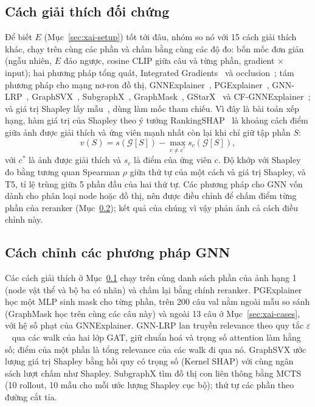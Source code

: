 \subsection{Cách giải thích đối chứng}\label{sec:xai-baselines}
Để biết $E$ (Mục~\ref{sec:xai-setup}) tốt tới đâu, nhóm so nó với 15 cách giải thích khác, chạy trên cùng các phần và chấm bằng cùng các độ đo: bốn
mốc đơn giản (ngẫu nhiên, $E$ đảo ngược, cosine CLIP giữa câu và từng phần, gradient $\times$ input); hai phương pháp tổng
quát, Integrated Gradients~\cite{xai-sundararajan2017ig} và occlusion~\cite{xai-zeiler2014occlusion}; tám phương pháp cho
mạng nơ-ron đồ thị, GNNExplainer~\cite{xai-ying2019gnnexplainer}, PGExplainer~\cite{xai-luo2020pgexplainer},
GNN-LRP~\cite{xai-schnake2022gnnlrp}, GraphSVX~\cite{xai-duval2021graphsvx}, SubgraphX~\cite{xai-yuan2021subgraphx},
GraphMask~\cite{xai-schlichtkrull2021graphmask}, GStarX~\cite{xai-zhang2022gstarx} và
CF-GNNExplainer~\cite{xai-lucic2022cfgnn}; và giá trị Shapley lấy mẫu~\cite{xai-castro2009shapley}, dùng làm mốc tham chiếu.
Vì đây là bài toán xếp hạng, hàm giá trị của Shapley theo ý tưởng RankingSHAP~\cite{xai-heuss2025rankingshap} là khoảng cách
điểm giữa ảnh được giải thích và ứng viên mạnh nhất còn lại khi chỉ giữ tập phần $S$:
\begin{equation}
  v(S)=s(\mathcal{G}[S])-\max_{c\neq c^{*}}s_c(\mathcal{G}[S]),
  \label{eq:shapley-value}
\end{equation}
với $c^{*}$ là ảnh được giải thích và $s_c$ là điểm của ứng viên $c$. Độ khớp với Shapley đo bằng tương quan Spearman $\rho$
giữa thứ tự của một cách và giá trị Shapley, và T5, tỉ lệ trùng giữa 5 phần đầu của hai thứ tự. Các phương pháp cho GNN vốn
dành cho phân loại node hoặc đồ thị, nên được điều chỉnh để chấm điểm từng phần của reranker (Mục~\ref{sec:xai-adapt}); kết quả
của chúng vì vậy phản ánh cả cách điều chỉnh này.

\subsection{Cách chỉnh các phương pháp GNN}\label{sec:xai-adapt}
Các cách giải thích ở Mục~\ref{sec:xai-baselines} chạy trên cùng danh sách phần của ảnh hạng 1 (node vật thể và bộ ba có nhãn)
và chấm lại bằng chính reranker.
PGExplainer học một MLP sinh mask cho từng phần, trên 200 câu val nằm ngoài mẫu so sánh (GraphMask học trên cùng các câu này) và ngoài 13 câu ở
Mục~\ref{sec:xai-cases}, với hệ số phạt của GNNExplainer. GNN-LRP lan truyền relevance theo quy tắc
$\varepsilon$~\cite{xai-bach2015lrp} qua các walk của hai lớp GAT, giữ chuẩn hoá và trọng số attention làm hằng số; điểm của
một phần là tổng relevance của các walk đi qua nó. GraphSVX ước lượng giá trị Shapley bằng hồi quy có trọng số (Kernel SHAP)
với cùng ngân sách lượt chấm như Shapley. SubgraphX tìm đồ thị con liên thông bằng MCTS (10 rollout, 10 mẫu cho mỗi ước lượng
Shapley cục bộ); thứ tự các phần theo đường cắt tỉa.

